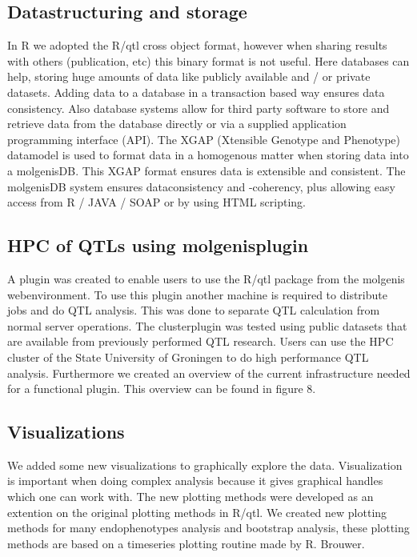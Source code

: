 \subsection{Datastructuring and storage}
In R we adopted the R/qtl cross object format, however when sharing results with others 
(publication, etc) this binary format is not useful. Here databases can help, storing huge amounts of data like publicly available 
and / or private datasets. Adding data to a database in a transaction based way ensures data consistency. 
Also database systems allow for third party software to store and retrieve data from the database directly or via
a supplied application programming interface (API). The XGAP \cite{morris07} (Xtensible Genotype and Phenotype) datamodel is used 
to format data in a homogenous matter when storing data into a molgenisDB. This XGAP format ensures data 
is extensible and consistent. The molgenisDB system ensures dataconsistency and -coherency, plus allowing easy 
access from R / JAVA / SOAP or by using HTML scripting.
\subsection{HPC of QTLs using molgenisplugin}
A plugin was created to enable users to use the R/qtl package from the molgenis webenvironment. To use this plugin another machine is required 
to distribute jobs and do QTL analysis. This was done to separate QTL calculation from normal server operations.
The clusterplugin was tested using public datasets that are available from previously performed QTL research. Users can use the HPC cluster 
of the State University of Groningen to do high performance QTL analysis.
Furthermore we created an overview of the current infrastructure needed for a functional plugin. This overview can be found in figure 8. 
\subsection{Visualizations}
We added some new visualizations to graphically explore the data. Visualization is important when doing complex analysis because 
it gives graphical handles which one can work with. The new plotting methods were developed as an extention on the original plotting methods in R/qtl.
We created new plotting methods for many endophenotypes analysis and bootstrap analysis, these plotting methods are based on a timeseries plotting 
routine made by R. Brouwer\cite{brouwer09}.